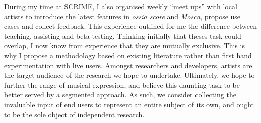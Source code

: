 \documentclass[journal,onecolumn]{IEEEtran}
\begin{document}
During my time at SCRIME, I also organised weekly ``meet ups'' with local artists to introduce the latest features in \textit{ossia score} and \textit{Mosca}, propose use cases and collect feedback. This experience outlined for me the difference between teaching, assisting and beta testing. Thinking initially that theses task could overlap, I now know from experience that they are mutually exclusive. This is why I propose a methodology based on existing literature rather than first hand experimentation with live users. Amongst researchers and developers, artists are the target audience of the research we hope to undertake. Ultimately, we hope to further the range of musical expression, and believe this daunting task to be better served by a segmented approach. As such, we consider collecting the invaluable input of end users to represent an entire subject of its own, and ought to be the sole object of independent research.
\end{document}
